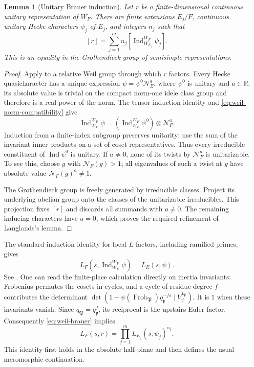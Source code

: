 \documentclass[11pt,a4paper]{article}
\numberwithin{equation}{section}
\newtheorem{lemma}[theorem]{Lemma}
\theoremstyle{definition}
\theoremstyle{remark}
\newcommand{\RR}{\mathbb R}
\begin{document}
\begin{lemma}[Unitary Brauer induction]\label{lem:unitary-brauer}
Let $r$ be a finite-dimensional continuous unitary representation of
$W_F$.  There are finite extensions $E_j/F$, continuous unitary
Hecke characters $\psi_j$ of $E_j$, and integers $n_j$ such that
\begin{equation}\label{eq:weil-brauer}
 [r]=\sum_{j=1}^m n_j
  \left[\operatorname{Ind}_{W_{E_j}}^{W_F}\psi_j\right].
\end{equation}
This is an equality in the Grothendieck group of semisimple
representations.  
\end{lemma}
\begin{proof}
Apply \cite[Lemma~2.2]{Langlands} to a relative Weil group through
which $r$ factors.    Every Hecke
quasicharacter has a unique expression
$\psi=\psi^0\mathcal N_E^a$, where $\psi^0$ is unitary and
$a\in\RR$: its absolute value is trivial on the compact norm-one
idele class group and therefore is a real power of the norm.
The tensor-induction identity
\cite[Lemma~2.3]{Langlands} and
\eqref{eq:weil-norm-compatibility} give
\[
 \operatorname{Ind}_{W_E}^{W_F}\psi
   =\left(\operatorname{Ind}_{W_E}^{W_F}\psi^0\right)
      \otimes\mathcal N_F^a.
\]
Induction from a finite-index subgroup preserves unitarity: use the
sum of the invariant inner products on a set of coset representatives.
Thus every irreducible constituent of $\operatorname{Ind}\psi^0$
is unitary.  If $a\ne0$, none of its twists by $\mathcal N_F^a$
is unitarizable.  To see this, choose $g$ with $\mathcal N_F(g)>1$;
all eigenvalues of such a twist at $g$ have absolute value
$\mathcal N_F(g)^a\ne1$.

The Grothendieck group is freely generated by irreducible classes.
Project its underlying abelian group onto the classes of the
unitarizable irreducibles.  This projection fixes $[r]$ and discards
all summands with $a\ne0$.  The remaining inducing characters have
$a=0$, which proves the required refinement of Langlands's lemma.
\end{proof}

The standard induction identity for local $L$-factors, including
ramified primes, gives
\begin{equation}\label{eq:weil-L-induction}
 L_F\!\left(s,\operatorname{Ind}_{W_E}^{W_F}\psi\right)
   =L_E(s,\psi).
\end{equation}
See \cite[Chapter~20, pp.~211--213]{Langlands}.  One can read the
finite-place calculation directly on inertia invariants: Frobenius
permutes the cosets in cycles, and a cycle of residue degree $f$
contributes the determinant
$\det(1-\psi(\operatorname{Frob}_{\mathfrak P})
 q_{\mathfrak p}^{-fs}\mid V_\psi^{I_{\mathfrak P}})$.
It is $1$ when these invariants vanish.  Since
$q_{\mathfrak P}=q_{\mathfrak p}^f$, its reciprocal is the
upstairs Euler factor.  Consequently \eqref{eq:weil-brauer} implies
\begin{equation}\label{eq:weil-L-product}
 L_F(s,r)=\prod_{j=1}^m L_{E_j}(s,\psi_j)^{n_j}.
\end{equation}
This identity first holds in the absolute half-plane and then defines
the usual meromorphic continuation.  
\end{document}
